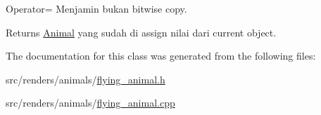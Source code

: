Operator= Menjamin bukan bitwise copy. 

\begin{DoxyReturn}{Returns}
\hyperlink{classAnimal}{Animal} yang sudah di assign nilai dari current object. 
\end{DoxyReturn}


The documentation for this class was generated from the following files\+:\begin{DoxyCompactItemize}
\item 
src/renders/animals/\hyperlink{flying__animal_8h}{flying\+\_\+animal.\+h}\item 
src/renders/animals/\hyperlink{flying__animal_8cpp}{flying\+\_\+animal.\+cpp}\end{DoxyCompactItemize}
